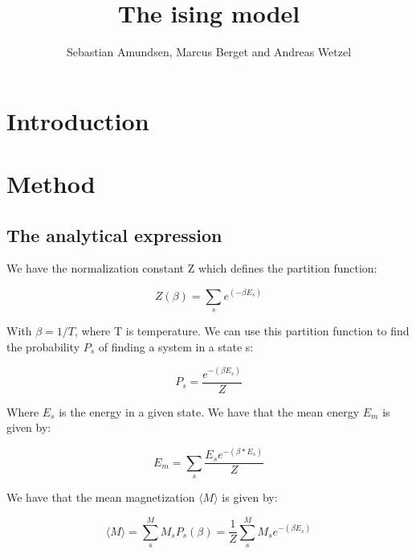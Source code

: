 \documentclass{article}
\begin{document}
\title{The ising model}
\author{Sebastian Amundsen, Marcus Berget and Andreas Wetzel}

\maketitle

\begin{abstract}

\end{abstract}

\begin{multicols}{2}

\section{Introduction}

\section{Method}

\subsection*{The analytical expression}

We have the normalization constant Z which defines the partition function:

\begin{equation}
Z(\beta) = \sum_{s} e^{(-\beta E_s)}
\label{eq:Z}
\end{equation}

With $\beta=1/T$, where T is temperature. We can use this partition function to find the probability $P_s$ of finding a system in a state s:

\begin{equation}
P_s=\frac{e^{-(\beta E_s)}}{Z}
\label{eq:P_s}
\end{equation}

Where $E_s$ is the energy in a given state. We have that the mean energy $E_m$ is given by:

\begin{equation}
E_m = \sum_s \frac{E_s e^{-(\beta*E_s)}}{Z}
\label{eq:E_m}
\end{equation}

We have that the mean magnetization $\langle M \rangle$ is given by:

\begin{equation}
\langle M \rangle=\sum_s^M M_s P_s(\beta)=\frac{1}{Z}\sum_s^M M_s e^{-(\beta E_s)}
\label{eq:mM}
\end{equation}


\end{multicols}
\end{document}
